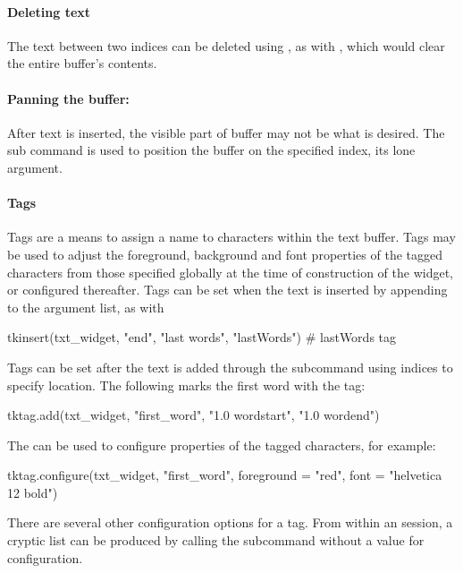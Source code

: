 \paragraph{Deleting text}

The text between two indices can be deleted using , as
with , which would clear the entire
buffer's contents.

\paragraph{Panning the buffer: }
After text is inserted, the visible part of buffer may not be what is
desired. The  sub command is used to position
the buffer on the specified index, its lone argument.


\paragraph{Tags}
Tags are a means to assign a name to characters within the text
buffer. Tags may be used to adjust the foreground, background and font
properties of the tagged characters from those specified globally at
the time of construction of the widget, or configured thereafter. Tags
can be set when the text is inserted by appending to the argument
list, as with
\begin{Schunk}
\begin{Sinput}
 tkinsert(txt_widget, "end", "last words", "lastWords") # lastWords tag
\end{Sinput}
\end{Schunk}

Tags can be set after the text is added through the
 subcommand using indices to specify
location. The following marks the first word with the 
tag:
\begin{Schunk}
\begin{Sinput}
 tktag.add(txt_widget, "first_word", "1.0 wordstart", "1.0 wordend")
\end{Sinput}
\end{Schunk}
The  can be used to configure properties of the tagged characters, for example:
\begin{Schunk}
\begin{Sinput}
 tktag.configure(txt_widget, "first_word", foreground = "red", 
                 font = "helvetica 12 bold")
\end{Sinput}
\end{Schunk}
%
There are several other configuration options for a tag. From within
an \R\/ session, a cryptic list can be produced by calling the
subcommand  without a value for
configuration.


